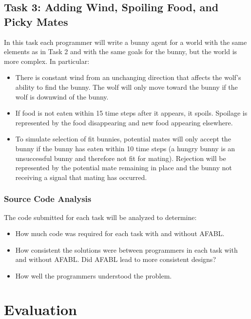 \subsection{Task 3: Adding Wind, Spoiling Food, and Picky Mates}\label{sec:task3}

In this task each programmer will write a bunny agent for a world with the same elements as in Task 2 and with the same goals for the bunny, but the world is more complex.  In particular:

\begin{itemize}

\item There is constant wind from an unchanging direction that affects the wolf's ability to find the bunny.  The wolf will only move toward the bunny if the wolf is downwind of the bunny.

\item If food is not eaten within 15 time steps after it appears, it spoils.  Spoilage is represented by the food disappearing and new food appearing elsewhere.

\item To simulate selection of fit bunnies, potential mates will only accept the bunny if the bunny has eaten within 10 time steps (a hungry bunny is an unsuccessful bunny and therefore not fit for mating).  Rejection will be represented by the potential mate remaining in place and the bunny not receiving a signal that mating has occurred.

\end{itemize}


\subsubsection{Source Code Analysis}

The code submitted for each task will be analyzed to determine:

\begin{itemize}
\item How much code was required for each task with and without AFABL.
\item How consistent the solutions were between programmers in each task with and without AFABL.  Did AFABL lead to more consistent designs?
\item How well the programmers understood the problem.
\end{itemize}

\section{Evaluation}

